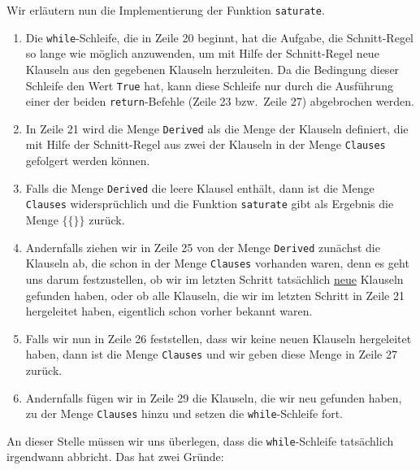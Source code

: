 Wir erläutern nun die Implementierung der Funktion \texttt{saturate}.
\begin{enumerate}
\item Die \texttt{while}-Schleife, die in Zeile 20 beginnt, hat die Aufgabe, die Schnitt-Regel
      so lange wie möglich anzuwenden, um mit Hilfe der Schnitt-Regel neue Klauseln aus den gegebenen
      Klauseln herzuleiten.  Da die Bedingung dieser Schleife den Wert \texttt{True} hat, kann diese
      Schleife nur durch die Ausführung einer der beiden \texttt{return}-Befehle (Zeile 23 bzw.~Zeile 27)
      abgebrochen werden. 
\item In Zeile 21 wird die Menge \texttt{Derived} als die Menge der Klauseln definiert, die mit Hilfe der
      Schnitt-Regel aus zwei der Klauseln in der Menge \texttt{Clauses} gefolgert werden können.
\item Falls die Menge \texttt{Derived} die leere Klausel enthält, dann ist die Menge
      \texttt{Clauses} widersprüchlich und die Funktion \texttt{saturate} gibt als Ergebnis die
      Menge $\bigl\{ \{\} \bigr\}$ zurück.
\item Andernfalls ziehen wir in Zeile 25 von der Menge \texttt{Derived} zunächst die Klauseln
      ab, die schon in der Menge \texttt{Clauses} vorhanden waren, denn es geht uns darum
      festzustellen, ob wir im letzten Schritt tatsächlich 
      \underline{neue} Klauseln gefunden haben, oder ob alle Klauseln, die wir im letzten Schritt in Zeile 21
      hergeleitet haben, eigentlich schon vorher bekannt waren.
\item Falls wir nun in Zeile 26 feststellen, dass wir keine neuen Klauseln hergeleitet haben,
      dann ist die Menge \texttt{Clauses}  und wir geben diese Menge in Zeile 27 zurück.
\item Andernfalls fügen wir in Zeile 29 die Klauseln, die wir neu gefunden haben, zu der Menge
      \texttt{Clauses} hinzu und setzen die \texttt{while}-Schleife fort.
\end{enumerate}
An dieser Stelle müssen wir uns überlegen, dass die \texttt{while}-Schleife tatsächlich irgendwann
abbricht.  Das hat zwei Gründe:  
